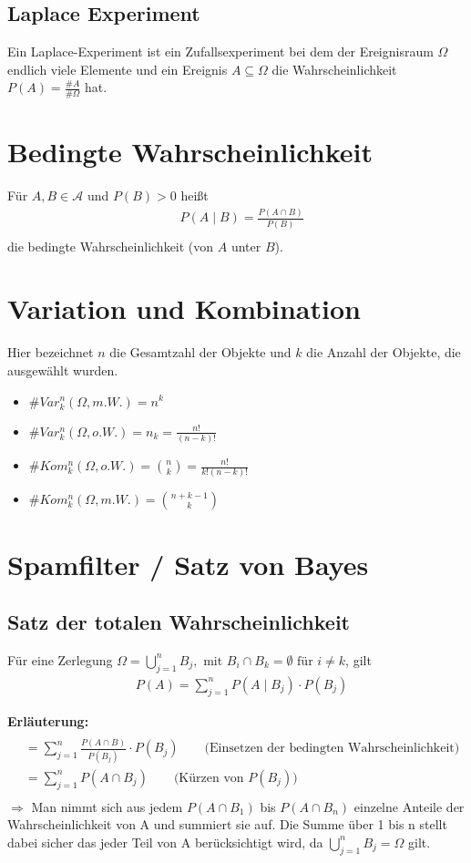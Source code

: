 \documentclass[a4paper]{article}
\begin{document}
\subsection{Laplace Experiment}
Ein Laplace-Experiment ist ein Zufallsexperiment bei dem der Ereignisraum $\Omega$ endlich viele Elemente und ein Ereignis $A \subseteq \Omega$ die Wahrscheinlichkeit $P(A) = \frac{\#A}{\#\Omega}$ hat.


\section{Bedingte Wahrscheinlichkeit}
Für $A,B \in \mathcal{A}$ und $P(B) > 0$ heißt
\begin{align*}
& P(A \; | \;  B) = \frac{P(A \cap B)}{P(B)} \\
\end{align*}
die bedingte Wahrscheinlichkeit (von $A$ unter $B$).


\section{Variation und Kombination}
Hier bezeichnet $n$ die Gesamtzahl der Objekte und $k$ die Anzahl der Objekte, die ausgewählt wurden.
\begin{itemize}
\item $\# Var_k^n(\Omega, m.W.)  = n^k$
\item $\# Var_k^n(\Omega, o.W.)  = n_k = \frac{n!}{(n-k)!}$  
\item $\#Kom_k^n(\Omega, o.W.) = \binom{n}{k} = \frac{n!}{k! (n-k)!}$  
\item $\#Kom_k^n(\Omega, m.W.)  = \binom{n + k -1}{k}$  
\end{itemize}


\section{Spamfilter / Satz von Bayes}

\subsection{Satz der totalen Wahrscheinlichkeit}
Für eine Zerlegung
$\Omega = \bigcup_{j=1}^{n} B_j, \text{ mit } B_i \cap B_k = \emptyset \text{ für } i \neq k $, gilt
\begin{align*}
& P(A ) = \sum_{j=1}^{n}  P(A \; | \;  B_j) \cdot P(B_j)
\end{align*}

\textbf{Erläuterung:}
\begin{align*} \\
& = \sum_{j=1}^{n} \frac{P(A \cap B)}{P(B_j)} \cdot P(B_j)  \quad \quad \text{(Einsetzen der bedingten Wahrscheinlichkeit})\\
& = \sum_{j=1}^{n} {P(A \cap B_j)} \quad \quad \text{(Kürzen von } P(B_j))\\
\end{align*}
$\Rightarrow$ Man nimmt sich aus jedem $P(A \cap B_1)$ bis $P(A \cap B_n)$ einzelne Anteile der Wahrscheinlichkeit von A und summiert sie auf. Die Summe über 1 bis n stellt dabei sicher das jeder Teil von A berücksichtigt wird, da $\bigcup_{j=1}^{n} B_j = \Omega$ gilt.\\
\end{document}
